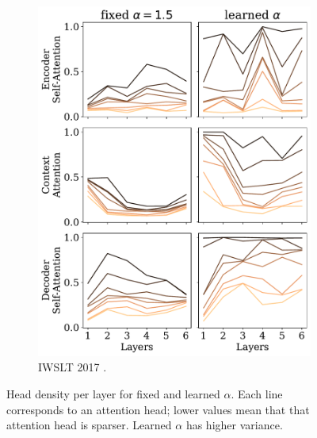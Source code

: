 \begin{figure}[!htbp]
\begin{subfigure}[b]{.49\linewidth}
        \includegraphics[width=\linewidth]{Figures/head_density_per_layer_de.pdf}
        \caption{%
            \label{fig:head_density_per_layer_de}%
            IWSLT 2017 .}
    \end{subfigure}
    \caption[Head density per layer for fixed and learned $\alpha$.]{%
        \label{fig:head_density_per_layer}
        Head density per layer for fixed and learned $\alpha$. Each line
        corresponds to an attention head; lower values mean that that
        attention head is sparser. Learned $\alpha$ has higher variance.
    }
\end{figure}

